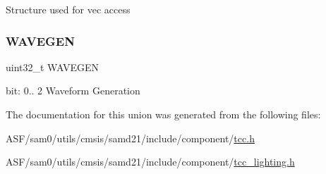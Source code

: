 Structure used for vec access \mbox{\label{union_t_c_c___w_a_v_e___type_a7030a93e0ff908875ce45f858ab9f153}} 
\subsubsection{\texorpdfstring{WAVEGEN}{WAVEGEN}}
{\footnotesize\ttfamily uint32\+\_\+t W\+A\+V\+E\+G\+EN}

bit\+: 0.. 2 Waveform Generation 

The documentation for this union was generated from the following files\+:\begin{DoxyCompactItemize}
\item 
A\+S\+F/sam0/utils/cmsis/samd21/include/component/\mbox{\hyperlink{tcc_8h}{tcc.\+h}}\item 
A\+S\+F/sam0/utils/cmsis/samd21/include/component/\mbox{\hyperlink{tcc__lighting_8h}{tcc\+\_\+lighting.\+h}}\end{DoxyCompactItemize}
